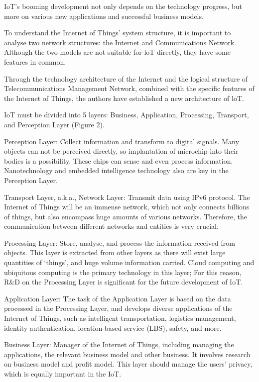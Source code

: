 \documentclass[12pt,a4paper, india]{article}
\begin{document}
\begin{arrowlist}

    \item IoT’s booming development not only depends on the technology progress, but more on various new applications and successful business models.

    \item To understand the Internet of Things' system structure, it is important to analyse two network structures: the Internet and Communications Network. Although the two models are not suitable for loT directly, they have some features in common. 

    \item Through the technology architecture of the Internet and the logical structure of Telecommunications Management Network, combined with the specific features of the Internet of Things, the authors have established a new architecture of loT.

    \item IoT must be divided into 5 layers: Business, Application, Processing, Transport, and Perception Layer (Figure 2). 

    \item Perception Layer: Collect information and transform to digital signals. Many objects can not be perceived directly, so implantation of microchip into their bodies is a possibility. These chips can sense and even process information. Nanotechnology and embedded intelligence technology also are key in the Perception Layer. 

    \item Transport Layer, a.k.a., Network Layer: Transmit data using IPv6 protocol. The Internet of Things will be an immense network, which not only connects billions of things, but also encompass huge amounts of various networks. Therefore, the communication between different networks and entities is very crucial. 

    \item Processing Layer: Store, analyse, and process the information received from objects. This layer is extracted from other layers as there will exist large quantities of ‘things’, and huge volume information carried. Cloud computing and ubiquitous computing is the primary technology in this layer; For this reason, R\&D on the Processing Layer is significant for the future development of IoT.

    \item Application Layer: The task of the Application Layer is based on the data processed in the Processing Layer, and develops diverse applications of the Internet of Things, such as intelligent transportation, logistics management, identity authentication, location-based service (LBS), safety, and more.

    \item Business Layer: Manager of the Internet of Things, including managing the applications, the relevant business model and other business. It involves research on business model and profit model. This layer should manage the users' privacy, which is equally important in the IoT.

\end{arrowlist}
\end{document}
